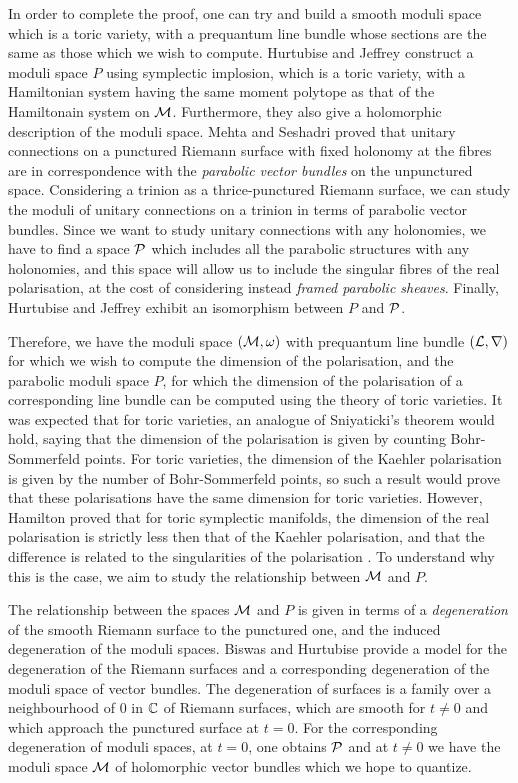 	In order to complete the proof, one can try and build a smooth moduli space which is a toric variety, with a prequantum line bundle whose sections are the same as those which we wish to compute. Hurtubise and Jeffrey \cite{hurtubise_moduli_2005}\cite{hurtubise_representations_2000} construct a moduli space $P$ using symplectic implosion, which is a toric variety, with a Hamiltonian system having the same moment polytope as that of the Hamiltonain system on $\mathcal{M}$. Furthermore, they also give a holomorphic description of the moduli space. Mehta and Seshadri \cite{mehta_moduli_1980} proved that unitary connections on a punctured Riemann surface with fixed holonomy at the fibres are in correspondence with the \textit{parabolic vector bundles} on the unpunctured space. Considering a trinion as a thrice-punctured Riemann surface, we can study the moduli of unitary connections on a trinion in terms of parabolic vector bundles. Since we want to study unitary connections with any holonomies, we have to find a space $\mathcal{P}$ which includes all the parabolic structures with any holonomies, and this space will allow us to include the singular fibres of the real polarisation, at the cost of considering instead \emph{framed parabolic sheaves}. Finally, Hurtubise and Jeffrey exhibit an isomorphism between $P$ and $\mathcal{P}$.
	
	Therefore, we have the moduli space $(\mathcal{M},\omega)$ with prequantum line bundle $(\mathcal{L},\nabla)$ for which we wish to compute the dimension of the polarisation, and the parabolic moduli space $P$, for which the dimension of the polarisation of a corresponding line bundle can be computed using the theory of toric varieties. It was expected that for toric varieties, an analogue of Sniyaticki's theorem would hold, saying that the dimension of the polarisation is given by counting Bohr-Sommerfeld points. For toric varieties, the dimension of the Kaehler polarisation is given by the number of Bohr-Sommerfeld points, so such a result would prove that these polarisations have the same dimension for toric varieties. However, Hamilton proved that for toric symplectic manifolds, the dimension of the real polarisation is strictly less then that of the Kaehler polarisation, and that the difference is related to the singularities of the polarisation \cite{hamilton_locally_2010}. To understand why this is the case, we aim to study the relationship between $\mathcal{M}$ and $P$.
	
	The relationship between the spaces $\mathcal{M}$ and $P$ is given in terms of a \textit{degeneration} of the smooth Riemann surface to the punctured one, and the induced degeneration of the moduli spaces. Biswas and Hurtubise \cite{biswas_degenerations_2021} provide a model for the degeneration of the Riemann surfaces and a corresponding degeneration of the moduli space of vector bundles. The degeneration of surfaces is a family over a neighbourhood of $0$ in $\mathbb{C}$ of Riemann surfaces, which are smooth for $t\neq0$ and which approach the punctured surface at $t=0$. For the corresponding degeneration of moduli spaces, at $t=0$, one obtains $\mathcal{P}$ and at $t\neq 0$ we have the moduli space $\mathcal{M}$ of holomorphic vector bundles which we hope to quantize. 
	
